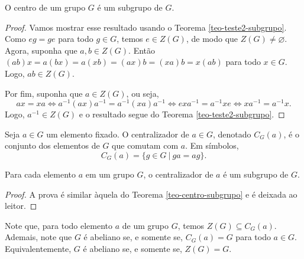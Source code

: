 %
\begin{theorem}
\label{teo-centro-subgrupo}
    O centro de um grupo $G$ é um subgrupo de $G$.
\end{theorem}
%
\begin{proof}
    Vamos mostrar esse resultado usando o Teorema \ref{teo-teste2-subgrupo}. Como
    $eg = ge$ para todo $g\in G$, temos $e\in Z(G)$, de modo que $Z(G)\neq\varnothing$.
    Agora, suponha que $a,b\in Z(G)$. Então $(ab)x = a(bx) = a(xb) = (ax)b = (xa)b = x(ab)$ para
    todo $x\in G$. Logo, $ab\in Z(G)$.
    
    Por fim, suponha que $a\in Z(G)$, ou seja,
    \[
    ax = xa \iff a^{-1}(ax)a^{-1} = a^{-1}(xa)a^{-1} \iff exa^{-1} = a^{-1}xe \iff xa^{-1} = a^{-1}x. 
    \]
    Logo, $a^{-1}\in Z(G)$ e o resultado segue do Teorema \ref{teo-teste2-subgrupo}.
\end{proof}
%
\begin{definition}[Centralizador]
\label{def-centralizador}
    Seja $a\in G$ um elemento fixado. O centralizador de $a\in G$, denotado $C_G(a)$,
    é o conjunto dos elementos de $G$ que comutam com $a$. Em símbolos,
    \[
    C_G(a) = \{ g\in G \ | \ ga = ag \}.
    \]
\end{definition}
%
\begin{theorem}
\label{teo-centralizador-subgrupo}
    Para cada elemento $a$ em um grupo $G$, o centralizador de $a$ é um subgrupo de $G$.
\end{theorem}
%
\begin{proof}
    A prova é similar àquela do Teorema \ref{teo-centro-subgrupo} e é deixada ao leitor.
\end{proof}
%
\begin{remark}
    Note que, para todo elemento $a$ de um grupo $G$, temos $Z(G)\subseteq C_G(a)$. Ademais,
    note que $G$ é abeliano se, e somente se, $C_G(a) = G$ para todo $a\in G$. Equivalentemente,
    $G$ é abeliano se, e somente se, $Z(G) = G$.
\end{remark}
%
